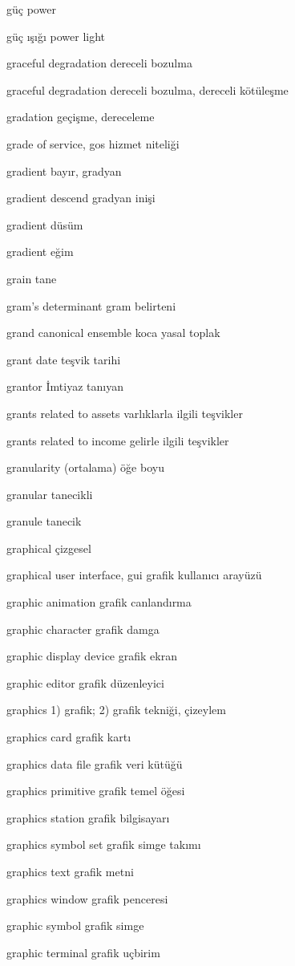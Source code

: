 \documentclass[12pt,fleqn]{article}\usepackage{../../common}
\begin{document}
güç power

güç ışığı power light

graceful degradation dereceli bozulma

graceful degradation dereceli bozulma, dereceli kötüleşme

gradation geçişme, dereceleme

grade of service, gos hizmet niteliği

gradient bayır, gradyan

gradient descend gradyan inişi

gradient düsüm

gradient eğim

grain tane

gram's determinant gram belirteni

grand canonical ensemble koca yasal toplak

grant date teşvik tarihi

grantor İmtiyaz tanıyan

grants related to assets varlıklarla ilgili teşvikler

grants related to income gelirle ilgili teşvikler

granularity (ortalama) öğe boyu

granular tanecikli

granule tanecik

graphical çizgesel

graphical user interface, gui grafik kullanıcı arayüzü

graphic animation grafik canlandırma

graphic character grafik damga

graphic display device grafik ekran

graphic editor grafik düzenleyici

graphics 1) grafik; 2) grafik tekniği, çizeylem

graphics card grafik kartı

graphics data file grafik veri kütüğü

graphics primitive grafik temel öğesi

graphics station grafik bilgisayarı

graphics symbol set grafik simge takımı

graphics text grafik metni

graphics window grafik penceresi

graphic symbol grafik simge

graphic terminal grafik uçbirim
\end{document}
